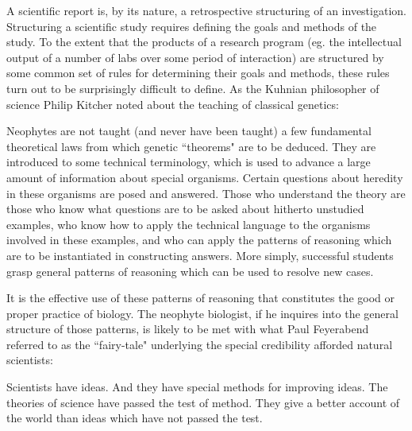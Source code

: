 A scientific report is, by its nature, a retrospective structuring of an investigation. Structuring a scientific study requires defining the goals and methods of the study. To the extent that the products of a research program (eg. the intellectual output of a number of labs over some period of interaction) are structured by some common set of rules for determining their goals and methods, these rules turn out to be surprisingly difficult to define. As the Kuhnian philosopher of science Philip Kitcher noted about the teaching of classical genetics:

\begin{longquote}

Neophytes are not taught (and never have been taught) a few fundamental theoretical laws from which genetic ``theorems" are to be deduced. They are introduced to some technical terminology, which is used to advance a large amount of information about special organisms. Certain questions about heredity in these organisms are posed and answered. Those who understand the theory are those who know what questions are to be asked about hitherto unstudied examples, who know how to apply the technical language to the organisms involved in these examples, and
who can apply the patterns of reasoning which are to be instantiated in constructing answers. More simply, successful students grasp general patterns of reasoning which can be used to resolve new cases. \cite{Kitcher1984}

\end{longquote}

It is the effective use of these patterns of reasoning that constitutes the good or proper practice of biology. The neophyte biologist, if he inquires into the general structure of those patterns, is likely to be met with what Paul Feyerabend referred to as the ``fairy-tale" underlying the special credibility afforded natural scientists:

\begin{longquote}

Scientists have ideas. And they have special methods for improving ideas. The theories of science have passed the test of method. They give a better account of the world than ideas which have not passed the test. \cite{Feyerabend1993}

\end{longquote}

